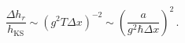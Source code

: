 \begin{equation}
\frac{\Delta h_r}{h_\mathrm{KS}} \sim (g^2 T \Delta x)^{-2}
\sim \left( \frac{a}{g^2 \hbar \Delta x} \right)^2 \, .
\label{eq49}
\end{equation}

